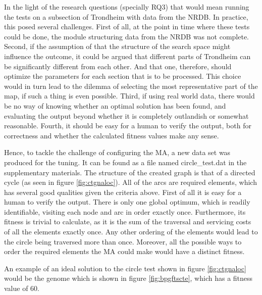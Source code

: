 In the light of the research questions (specially RQ3) that would mean running the tests on a subsection of Trondheim with data from the NRDB. In practice, this posed several challenges. First of all, at the point in time where these tests could be done, the module structuring data from the NRDB was not complete. Second, if the assumption of that the structure of the search space might influence the outcome, it could be argued that different parts of Trondheim can be significantly different from each other. And that one, therefore, should optimize the parameters for each section that is to be processed. This choice would in turn lead to the dilemma of selecting the most representative part of the map, if such a thing is even possible. Third, if using real world data, there would be no way of knowing whether an optimal solution has been found, and evaluating the output beyond whether it is completely outlandish or somewhat reasonable. Fourth, it should be easy for a human to verify the output, both for correctness and whether the calculated fitness values make any sense.

Hence, to tackle the challenge of configuring the MA, a new data set was produced for the tuning. It can be found as a file named circle\_test.dat in the supplementary materials. The structure of the created graph is that of a directed cycle (as seen in figure \ref{fig:ctgnaloc}). All of the arcs are required elements, which has several good qualities given the criteria above. First of all it is easy for a human to verify the output. There is only one global optimum, which is readily identifiable, visiting each node and arc in order exactly once. Furthermore, its fitness is trivial to calculate, as it is the sum of the traversal and servicing costs of all the elements exactly once. Any other ordering of the elements would lead to the circle being traversed more than once. Moreover, all the possible ways to order the required elements the MA could make would have a distinct fitness.

An example of an ideal solution to the circle test shown in figure \ref{fig:ctgnaloc} would be the genome which is shown in figure \ref{fig:bpgftscte}, which has a fitness value of 60.

